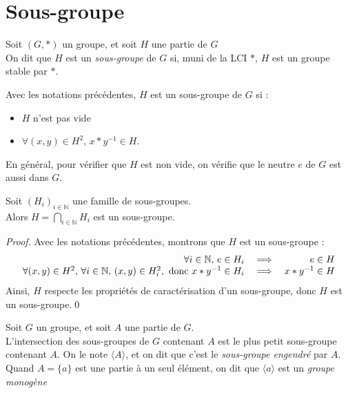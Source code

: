 \documentclass[11pt,a4paper,fleqn,pdftex]{report}
\begin{document}
\section{Sous-groupe} %
\label{sec:sous_groupe}
\begin{dfn}
     Soit $(G,*)$ un groupe, et soit $H$ une partie de $G$\\
     On dit que $H$ est un \emph{sous-groupe} de $G$ si, muni de la \gls{LCI} $*$, $H$ est un groupe stable par $*$.
\end{dfn}
\begin{itheorem}
     Avec les notations précédentes, $H$ est un sous-groupe de $G$ si : 
     \begin{itemize}
         \item $H$ n'est pas vide
         \item $\forall (x,y) \in H^2,\, x*y^{-1} \in H$.
     \end{itemize}
     En général, pour vérifier que $H$ est non vide, on vérifie que le neutre $e$ de $G$ est aussi dans $G$.
\end{itheorem}
\begin{theorem}
     Soit $\left( H_i \right)_{i\in \mathbb{N}}$ une famille de sous-groupes.\\
     Alors $H=\bigcap_{i\in \mathbb{N}} H_i$ est un sous-groupe.
\end{theorem}
\begin{proof}
     Avec les notations précédentes, montrons que $H$ est un sous-groupe : 
     \[
     \begin{array}{r c r}
         \forall i\in \mathbb{N},\, e\in H_i &\implies & e\in H \\
         \forall (x,y)\in H^2,\, \forall i\in \mathbb{N},\, (x,y)\in H_i^2,\text{ donc }x*y^{-1}\in H_i & \implies & x*y^{-1}\in H
     \end{array}
     \]
     Ainsi, $H$ respecte les propriétés de caractérisation d'un sous-groupe, donc $H$ est un sous-groupe.\qed
\end{proof}
\begin{dfn}
     Soit $G$ un groupe, et soit $A$ une partie de $G$. \\
     L'intersection des sous-groupes de $G$ contenant $A$ est le plus petit sous-groupe contenant $A$. On le note $\langle A \rangle$, et on dit que c'est le \emph{sous-groupe engendré} par $A$.\\
     Quand $A=\lbrace a \rbrace$ est une partie à un seul élément, on dit que $\langle a \rangle$ est un \emph{groupe monogène}
\end{dfn}
\end{document}
